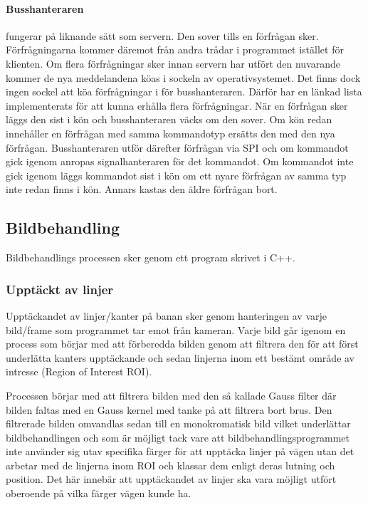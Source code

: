 \documentclass[tekniskrapport/tech.tex]{subfiles}
\begin{document}
\paragraph{Busshanteraren} fungerar på liknande sätt som servern. Den sover
tills en förfrågan sker. Förfrågningarna kommer däremot från andra trådar i
programmet istället för klienten. Om flera förfrågningar sker innan servern har
utfört den nuvarande kommer de nya meddelandena köas i sockeln av
operativsystemet. Det finns dock ingen sockel att köa förfrågningar i för
busshanteraren. Därför har en länkad lista implementerats för att kunna erhålla
flera förfrågningar. När en förfrågan sker läggs den sist i kön och
busshanteraren väcks om den sover. Om kön redan innehåller en förfrågan med
samma kommandotyp ersätts den med den nya förfrågan. Busshanteraren utför
därefter förfrågan via SPI och om kommandot gick igenom anropas
signalhanteraren för det kommandot. Om kommandot inte gick igenom läggs
kommandot sist i kön om ett nyare förfrågan av samma typ inte redan finns i
kön. Annars kastas den äldre förfrågan bort.

\subsection{Bildbehandling}
Bildbehandlings processen sker genom ett program skrivet i C++.

\subsubsection{Upptäckt av linjer}
Upptäckandet av linjer/kanter på banan sker genom hanteringen av varje
bild/frame som programmet tar emot från kameran. Varje bild går igenom en
process som börjar med att förberedda bilden genom att filtrera den för att
först underlätta kanters upptäckande och sedan linjerna inom ett bestämt område
av intresse (Region of Interest ROI).

Processen börjar med att filtrera bilden med den så kallade Gauss filter där
bilden faltas med en Gauss kernel med tanke på att filtrera bort brus. Den
filtrerade bilden omvandlas sedan till en monokromatisk bild vilket underlättar
bildbehandlingen och som är möjligt tack vare att bildbehandlingsprogrammet
inte använder sig utav specifika färger för att upptäcka linjer på vägen utan
det arbetar med de linjerna inom ROI och klassar dem enligt deras lutning och
position. Det här innebär att upptäckandet av linjer ska vara möjligt utfört
oberoende på vilka färger vägen kunde ha. 
\end{document}
